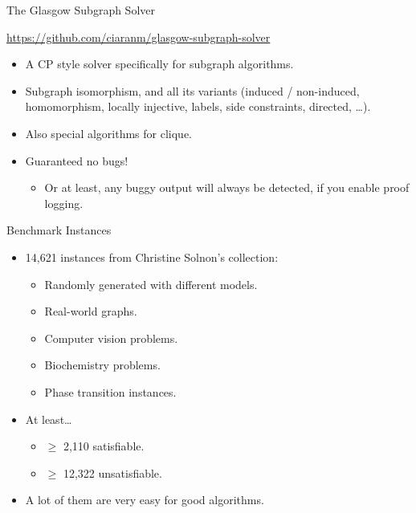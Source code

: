 \documentclass{beamer}
\begin{document}
\begin{frame}{The Glasgow Subgraph Solver}
    \begin{center}
        \url{https://github.com/ciaranm/glasgow-subgraph-solver}
    \end{center}

    \begin{itemize}
        \item A CP style solver specifically for subgraph algorithms.
        \item Subgraph isomorphism, and all its variants (induced / non-induced, homomorphism,
            locally injective, labels, side constraints, directed, \ldots).
        \item Also special algorithms for clique.
        \item Guaranteed no bugs!
            \begin{itemize}
                \item<2-> Or at least, any buggy output will always be detected, if you enable proof
                    logging.
            \end{itemize}
    \end{itemize}
\end{frame}

\begin{frame}{Benchmark Instances}
    \begin{itemize}
        \item 14,621 instances from Christine Solnon's collection:
            \begin{itemize}
                \item Randomly generated with different models.
                \item Real-world graphs.
                \item Computer vision problems.
                \item Biochemistry problems.
                \item Phase transition instances.
            \end{itemize}
        \item At least\ldots
            \begin{itemize}
                \item $\ge$ 2,110 satisfiable.
                \item $\ge$ 12,322 unsatisfiable.
            \end{itemize}
        \item A lot of them are very easy for good algorithms.
    \end{itemize}
\end{frame}
\end{document}
